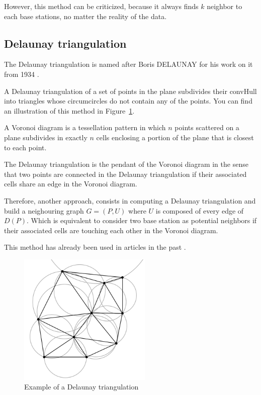\documentclass[lettersize,journal,english]{IEEEtran}
\begin{document}
However, this method can be criticized, because it always finds $k$ neighbor to each base stations, no matter the reality of the 
data.

\subsection{Delaunay triangulation}
\noindent The Delaunay triangulation is named after Boris DELAUNAY for his work on it from 1934 \cite{art_delaunay}.

A Delaunay triangulation of a set of points in the plane subdivides their \gls{convHull} into triangles whose circumcircles 
do not contain any of the points. You can find an illustration of this method in Figure~\ref{del_tri}.

A Voronoi diagram is a tessellation pattern in which $n$ points scattered on a plane subdivides in 
exactly $n$ cells enclosing a portion of the plane that is closest to each point. 

The Delaunay triangulation is the pendant of the Voronoi diagram in the sense that two points are connected in the
Delaunay triangulation if their associated cells share an edge in the Voronoi diagram. 

Therefore, another approach, consists in computing a Delaunay triangulation and build a neighouring graph $G = (P, U)$ where $U$ 
is composed of every edge of $D(P)$. Which is equivalent to consider two base station as potential neighbors if their associated
cells are touching each other in the Voronoi diagram.

This method has already been used in articles in the past \cite{delaunay_neighbor}.


\begin{figure}[!t]
    \centering
    \includegraphics[width=2.5in]{images/illus_graphs/Delaunay_circumcircles_vectorial.svg.png}
    \caption{Example of a Delaunay triangulation}
    \label{del_tri}
\end{figure}
\end{document}
